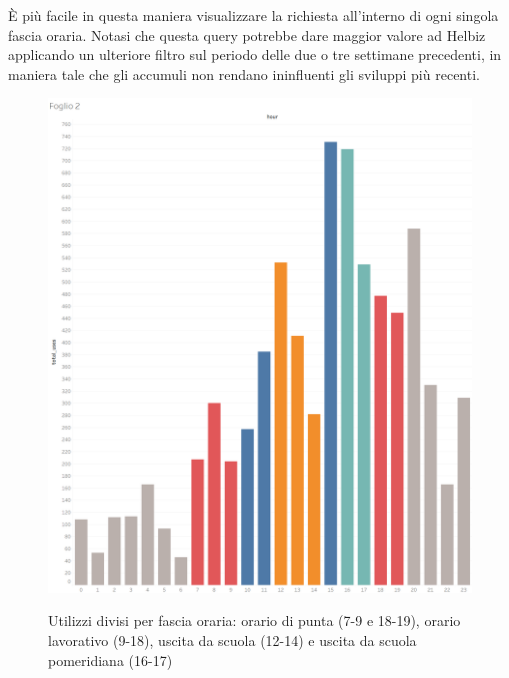 È più facile in questa maniera visualizzare la richiesta all'interno di ogni singola fascia oraria.
Notasi che questa query potrebbe dare maggior valore ad Helbiz applicando un ulteriore filtro sul periodo delle due o tre settimane precedenti,
in maniera tale che gli accumuli non rendano ininfluenti gli sviluppi più recenti.

\begin{figure}[H]                                                                                                                                                            
\centering                                                                                                                                                                   
\includegraphics[width=\textwidth]{images/result6}                                                                                                                                   
\label{fig:result6}
\caption{Utilizzi divisi per fascia oraria: orario di punta (7-9 e 18-19), orario lavorativo (9-18), uscita da scuola (12-14) e uscita da scuola pomeridiana (16-17)}                                                                                                                                                           
\end{figure}
